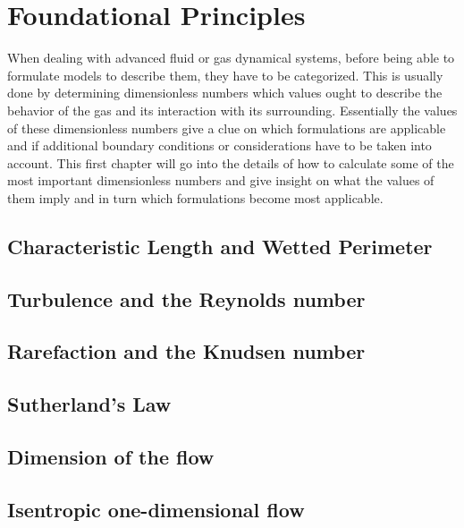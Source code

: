
\section{Foundational Principles}
	When dealing with advanced fluid or gas dynamical systems, before being able to formulate models to describe them, they have to be categorized.
	This is usually done by determining dimensionless numbers which values ought to describe the behavior of the gas and its interaction with its surrounding.
	Essentially the values of these dimensionless numbers give a clue on which formulations are applicable and if additional boundary conditions or considerations have to be taken into account.
	This first chapter will go into the details of how to calculate some of the most important dimensionless numbers and give insight on what the values of them imply and in turn which formulations become most applicable.

\subsection{Characteristic Length and Wetted Perimeter}\label{sec:characteristic-length}


\subsection{Turbulence and the Reynolds number}


\subsection{Rarefaction and the Knudsen number}


\subsection{Sutherland's Law}


\subsection{Dimension of the flow}\label{sec:flow-dimension-foundations}


\subsection{Isentropic one-dimensional flow}\label{sec:isentropic-1D-foundations}

